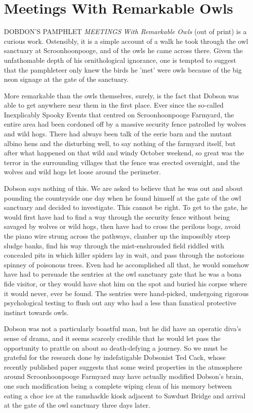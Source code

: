 \chapter{Meetings With Remarkable Owls}

DOBDON'S PAMPHLET \emph{MEETINGS With Remarkable Owls} (out of print) is a curious work. Ostensibly, it is a simple account of a walk he took through the owl sanctuary at Scroonhoonpooge, and of the owls he came across there. Given the unfathomable depth of his ornithological ignorance, one is tempted to suggest that the pamphleteer only knew the birds he 'met' were owls because of the big neon signage at the gate of the sanctuary.

More remarkable than the owls themselves, surely, is the fact that Dobson was able to get anywhere near them in the first place. Ever since the so-called Inexplicably Spooky Events that centred on Scroonhoonpooge Farmyard, the entire area had been cordoned off by a massive security fence patrolled by wolves and wild hogs. There had always been talk of the eerie barn and the mutant albino hens and the disturbing well, to say nothing of the farmyard itself, but after what happened on that wild and windy October weekend, so great was the terror in the surrounding villages that the fence was erected overnight, and the wolves and wild hogs let loose around the perimeter.

Dobson says nothing of this. We are asked to believe that he was out and about pounding the countryside one day when he found himself at the gate of the owl sanctuary and decided to investigate. This cannot be right. To get to the gate, he would first have had to find a way through the security fence without being savaged by wolves or wild hogs, then have had to cross the perilous bogs, avoid the piano wire strung across the pathways, clamber up the impossibly steep sludge banks, find his way through the mist-enshrouded field riddled with concealed pits in which killer spiders lay in wait, and pass through the notorious spinney of poisonous trees. Even had he accomplished all that, he would somehow have had to persuade the sentries at the owl sanctuary gate that he was a bona fide visitor, or they would have shot him on the spot and buried his corpse where it would never, ever be found. The sentries were hand-picked, undergoing rigorous psychological testing to flush out any who had a less than fanatical protective instinct towards owls.

Dobson was not a particularly boastful man, but he did have an operatic diva's sense of drama, and it seems scarcely credible that he would let pass the opportunity to prattle on about so death-defying a journey. So we must be grateful for the research done by indefatigable Dobsonist Ted Cack, whose recently published paper suggests that some weird properties in the atmosphere around Scroonhoonpooge Farmyard may have actually modified Dobson's brain, one such modification being a complete wiping clean of his memory between eating a choc ice at the ramshackle kiosk adjacent to Sawdust Bridge and arrival at the gate of the owl sanctuary three days later.

